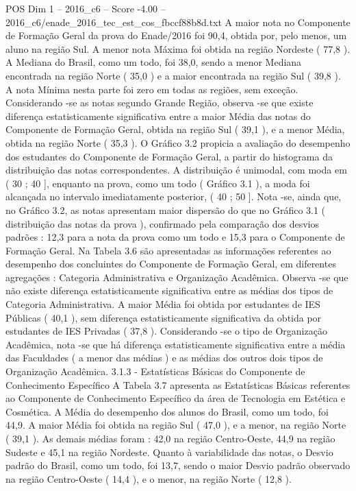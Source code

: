 \begin{textsample}{POS Dim 1 – 2016\_c6 – Score -4.00 – 2016\_c6/enade\_2016\_tec\_est\_cos\_fbccf88b8d.txt}
A maior nota no Componente de Formação Geral da prova do Enade/2016 foi 90,4, obtida por, pelo menos, um aluno na região Sul.
A menor nota Máxima foi obtida na região Nordeste ( 77,8 ).
A Mediana do Brasil, como um todo, foi 38,0, sendo a menor Mediana encontrada na região Norte ( 35,0 ) e a maior encontrada na região Sul ( 39,8 ).
A nota Mínima nesta parte foi zero em todas as regiões, sem exceção.
Considerando -se as notas segundo Grande Região, observa -se que existe diferença estatisticamente significativa entre a maior Média das notas do Componente de Formação Geral, obtida na região Sul ( 39,1 ), e a menor Média, obtida na região Norte ( 35,3 ).
O Gráfico 3.2 propicia a avaliação do desempenho dos estudantes do Componente de Formação Geral, a partir do histograma da distribuição das notas correspondentes.
A distribuição é unimodal, com moda em ( 30 ; 40 ], enquanto na prova, como um todo ( Gráfico 3.1 ), a moda foi alcançada no intervalo imediatamente posterior, ( 40 ; 50 ].
Nota -se, ainda que, no Gráfico 3.2, as notas apresentam maior dispersão do que no Gráfico 3.1 ( distribuição das notas da prova ), confirmado pela comparação dos desvios padrões : 12,3 para a nota da prova como um todo e 15,3 para o Componente de Formação Geral.
Na Tabela 3.6 são apresentadas as informações referentes ao desempenho dos concluintes do Componente de Formação Geral, em diferentes agregações : Categoria Administrativa e Organização Acadêmica.
Observa -se que não existe diferença estatisticamente significativa entre as médias dos tipos de Categoria Administrativa.
A maior Média foi obtida por estudantes de IES Públicas ( 40,1 ), sem diferença estatisticamente significativa da obtida por estudantes de IES Privadas ( 37,8 ).
Considerando -se o tipo de Organização Acadêmica, nota -se que há diferença estatisticamente significativa entre a média das Faculdades ( a menor das médias ) e as médias dos outros dois tipos de Organização Acadêmica. 3.1.3 - Estatísticas Básicas do Componente de Conhecimento Específico A Tabela 3.7 apresenta as Estatísticas Básicas referentes ao Componente de Conhecimento Específico da área de Tecnologia em Estética e Cosmética.
A Média do desempenho dos alunos do Brasil, como um todo, foi 44,9.
A maior Média foi obtida na região Sul ( 47,0 ), e a menor, na região Norte ( 39,1 ).
As demais médias foram : 42,0 na região Centro-Oeste, 44,9 na região Sudeste e 45,1 na região Nordeste.
Quanto à variabilidade das notas, o Desvio padrão do Brasil, como um todo, foi 13,7, sendo o maior Desvio padrão observado na região Centro-Oeste ( 14,4 ), e o menor, na região Norte ( 12,8 ).

\end{textsample}
